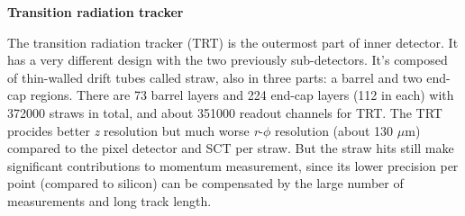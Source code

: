 \textbf{Transition radiation tracker}

The transition radiation tracker (TRT)\cite{TRT_2008} is the outermost part of inner detector.
It has a very different design with the two previously sub-detectors. It's composed of thin-walled drift tubes called straw, also in three parts: a barrel and two end-cap regions.
There are 73 barrel layers and 224 end-cap layers (112 in each) with 372000 straws in total, and about 351000 readout channels for TRT.
The TRT procides better \textit{z} resolution but much worse \textit{r}-$\phi$ resolution (about 130 $\mu$m) compared to the pixel detector and SCT per straw.
But the straw hits still make significant contributions to momentum measurement, since its lower precision per point (compared to silicon) can be compensated by the large number of measurements and long track length.
